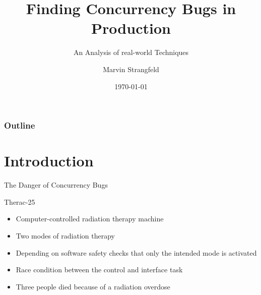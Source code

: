 \documentclass[english,aspectratio=43,t]{beamer}
\title[Cool]{Finding Concurrency Bugs in Production}
\author{Marvin Strangfeld}
\subtitle{An Analysis of real-world Techniques}
\date{\today}
\begin{document}
\titleframe


\begin{frame}
	\frametitle{Outline}
	\tableofcontents
\end{frame}


\section{Introduction}
\frame\sectionpage

\begin{frame}[c]{The Danger of Concurrency Bugs}
    \centering
    \begin{block}{Therac-25}
        \begin{itemize}
            \item Computer-controlled radiation therapy machine
            \item Two modes of radiation therapy
            \item Depending on software safety checks that only the intended mode is activated
            \item Race condition between the control and interface task
            \item Three people died because of a radiation overdose
        \end{itemize}
    \end{block}
\end{frame}

\end{document}

